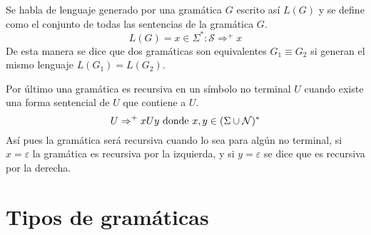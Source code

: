 Se habla de lenguaje generado por una gramática $G$ escrito así $L(G)$ y se define como el conjunto de todas las sentencias de la gramática $G$.  \[L(G) = x\in \Sigma^{*}:\mathcal{S} \Rightarrow^{+}x\]
De esta manera se dice que dos gramáticas son equivalentes $G_{1} \equiv G_{2}$ si generan el mismo lenguaje $L(G_{1})=L(G_{2})$.

Por último una gramática es recursiva en un símbolo no terminal $U$ cuando existe una forma sentencial de $U$ que contiene a $U$. \[U \Rightarrow^{+}xUy \textup{ donde } x,y\in (\Sigma \cup \mathcal{N})^{*} \]
Así pues la gramática será recursiva cuando lo sea para algún no terminal, si $x = \varepsilon$ la gramática es recursiva por la izquierda, y si $y = \varepsilon$ se dice que es recursiva por la derecha.

\section{Tipos de gramáticas }


